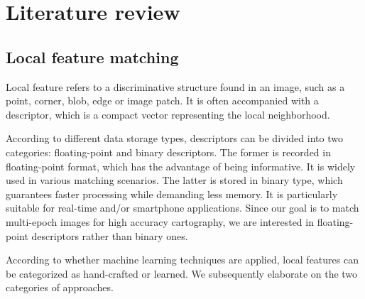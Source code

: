 
\chapter{Literature review}
\label{chap:review}
\minitoc

\section{Local feature matching}
Local feature refers to a discriminative structure found in an image, such as a point, corner, blob, edge or image patch. It is often accompanied with a descriptor, which is a compact vector representing the local neighborhood.
\par
According to different data storage types, descriptors can be divided into two categories: floating-point and binary descriptors. The former is recorded in floating-point format, which has the advantage of being informative. It is widely used in various matching scenarios.
The latter is stored in binary type, which guarantees faster processing while demanding less memory. It is particularly suitable for real-time and/or smartphone applications.
Since our goal is to match multi-epoch images for high accuracy cartography, we are interested in floating-point descriptors rather than binary ones.
\par
According to whether machine learning techniques are applied, local features can be categorized as hand-crafted or learned. We subsequently elaborate on the two categories of approaches.
